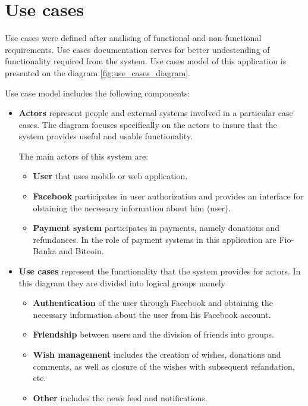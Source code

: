 \newcommand{\uccomponent}[1]{
\item \textbf{#1}
}
\newcommand{\ucactor}[1]{
\item \textbf{#1}
}
\newcommand{\ucgroup}[1]{
\item \textbf{#1}
}
\section{Use cases}
Use cases were defined after analising of functional and non-functional requirements. Use cases documentation serves for
better undestending of functionality required from the system. Use cases model of this application is presented on the
diagram \ref{fig:use_cases_diagram}.

Use case model includes the following components:

\begin{itemize}
\uccomponent{Actors} represent people and external systems involved in a particular case cases. The diagram focuses
specifically on the actors to insure that the system provides useful and usable functionality.

The main actors of this system are:
\begin{itemize}
\ucactor{User} that uses mobile or web application.
\ucactor{Facebook} participates in user authorization and provides an interface for obtaining the necessary information
about him (user).
\ucactor{Payment system} participates in payments, namely donations and refundances. In the role of payment systems in
this application are Fio-Banka and Bitcoin.
\end{itemize}

\uccomponent{Use cases} represent the functionality that the system provides for actors. In this diagram they are
divided into logical groups namely
\begin{itemize}
\ucgroup{Authentication} of the user through Facebook and obtaining the necessary information about the user from his
Facebook account.
\ucgroup{Friendship} between users and the division of friends into groups.
\ucgroup{Wish management} includes the creation of wishes, donations and comments, as well as closure of the wishes with
subsequent refandation, etc.
\ucgroup{Other} includes the news feed and notifications.
\end{itemize}

\end{itemize}




